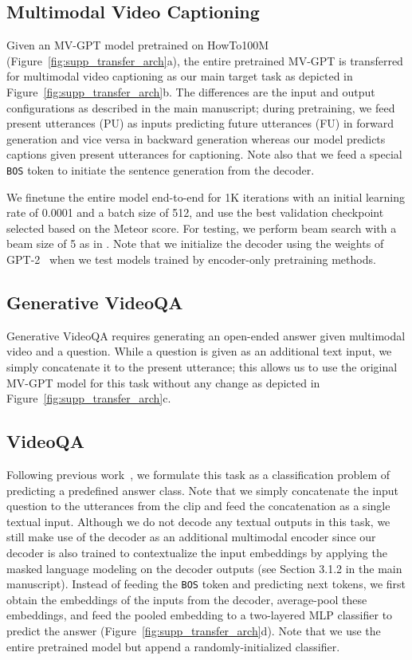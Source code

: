 \documentclass[10pt,twocolumn,letterpaper]{article}
\begin{document}
\subsection{Multimodal Video Captioning}
Given an MV-GPT model pretrained on HowTo100M (Figure~\ref{fig:supp_transfer_arch}a), the entire pretrained MV-GPT is transferred for multimodal video captioning as our main target task as depicted in Figure~\ref{fig:supp_transfer_arch}b.
The differences are the input and output configurations as described in the main manuscript; during pretraining, we feed present utterances (PU) as inputs predicting future utterances (FU) in forward generation and vice versa in backward generation whereas our model predicts captions given present utterances for captioning.
Note also that we feed a special \texttt{BOS} token to initiate the sentence generation from the decoder.

We finetune the entire model end-to-end for 1K iterations with an initial learning rate of 0.0001 and a batch size of 512, and use the best validation checkpoint selected based on the Meteor score. For testing, we perform beam search with a beam size of 5 as in \cite{luo2020univl}. 
Note that we initialize the decoder using the weights of GPT-2~\cite{radford2019language} when we test models trained by encoder-only pretraining methods. 

\subsection{Generative VideoQA}
Generative VideoQA requires generating an open-ended answer given multimodal video and a question. 
While a question is given as an additional text input, we simply concatenate it to the present utterance; this allows us to use the original MV-GPT model for this task without any change as depicted in Figure~\ref{fig:supp_transfer_arch}c.



\subsection{VideoQA}
Following previous work~\cite{tang2021decembert}, we formulate this task as a classification problem of predicting a predefined answer class.
Note that we simply concatenate the input question to the utterances from the clip and feed the concatenation as a single textual input.
Although we do not decode any textual outputs in this task, we still make use of the decoder as an additional multimodal encoder since our decoder is also trained to contextualize the input embeddings by applying the masked language modeling on the decoder outputs (see Section 3.1.2 in the main manuscript).
Instead of feeding the \texttt{BOS} token and predicting next tokens, we first obtain the embeddings of the inputs from the decoder, average-pool these embeddings, and feed the pooled embedding to a two-layered MLP classifier to predict the answer (Figure~\ref{fig:supp_transfer_arch}d).
Note that we use the entire pretrained model but append a randomly-initialized classifier.
\end{document}
